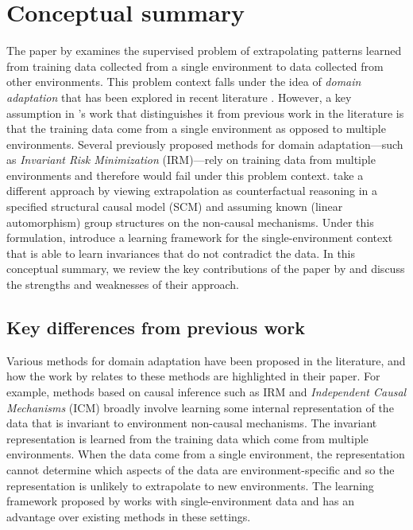 

\section{Conceptual summary}

The paper by \textcite{Mouli:2021} examines the supervised problem of extrapolating patterns learned from training data collected from a single environment to data collected from other environments. This problem context falls under the idea of \textit{domain adaptation} that has been explored in recent literature \parencite{Farahani:2020}. However, a key assumption in \citeauthor{Mouli:2021}'s work that distinguishes it from previous work in the literature is that the training data come from a single environment as opposed to multiple environments. Several previously proposed methods for domain adaptation---such as \textit{Invariant Risk Minimization} \parencite{Arjovsky:2020} (IRM)---rely on training data from multiple environments and therefore would fail under this problem context. \citeauthor{Mouli:2021} take a different approach by viewing extrapolation as counterfactual reasoning in a specified structural causal model (SCM) and assuming known (linear automorphism) group structures on the non-causal mechanisms. Under this formulation, \citeauthor{Mouli:2021} introduce a learning framework for the single-environment context that is able to learn invariances that do not contradict the data. In this conceptual summary, we review the key contributions of the paper by \textcite{Mouli:2021} and discuss the strengths and weaknesses of their approach.


\subsection{Key differences from previous work}

Various methods for domain adaptation have been proposed in the literature, and how the work by \textcite{Mouli:2021} relates to these methods are highlighted in their paper. For example, methods based on causal inference such as IRM and \textit{Independent Causal Mechanisms} \parencite{Parascandolo:2018} (ICM) broadly involve learning some internal representation of the data that is invariant to environment non-causal mechanisms. The invariant representation is learned from the training data which come from multiple environments. When the data come from a single environment, the representation cannot determine which aspects of the data are environment-specific and so the representation is unlikely to extrapolate to new environments. The learning framework proposed by \citeauthor{Mouli:2021} works with single-environment data and has an advantage over existing methods in these settings.
\\

